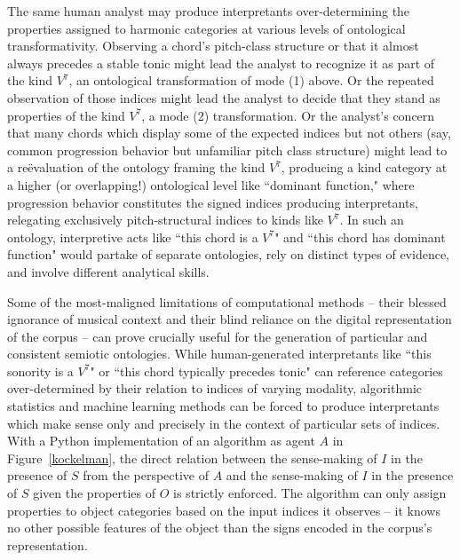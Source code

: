 The same human analyst may produce interpretants over-determining the properties assigned to harmonic categories at various levels of ontological transformativity.  Observing a chord's pitch-class structure or that it almost always precedes a stable tonic might lead the analyst to recognize it as part of the kind $V^7$, an ontological transformation of mode (1) above.  Or the repeated observation of those indices might lead the analyst to decide that they stand as properties of the kind $V^7$, a mode (2) transformation.  Or the analyst's concern that many chords which display some of the expected indices but not others (say, common progression behavior but unfamiliar pitch class structure) might lead to a re\"{e}valuation of the ontology framing the kind $V^7$, producing a kind category at a higher (or overlapping!) ontological level like ``dominant function," where progression behavior constitutes the signed indices producing interpretants, relegating exclusively pitch-structural indices to kinds like $V^7$.  In such an ontology, interpretive acts like ``this chord is a $V^7$" and ``this chord has dominant function" would partake of separate ontologies, rely on distinct types of evidence, and involve different analytical skills.

Some of the most-maligned limitations of computational methods -- their blessed ignorance of musical context and their blind reliance on the digital representation of the corpus -- can prove crucially useful for the generation of particular and consistent semiotic ontologies.  While human-generated interpretants like ``this sonority is a $V^7$" or ``this chord typically precedes tonic" can reference categories over-determined by their relation to indices of varying modality, algorithmic statistics and machine learning methods can be forced to produce interpretants which make sense only and precisely in the context of particular sets of indices.  With a Python implementation of an algorithm as agent $A$ in Figure~\ref{kockelman}, the direct relation between the sense-making of $I$ in the presence of $S$ from the perspective of $A$ and the sense-making of $I$ in the presence of $S$ given the properties of $O$ is strictly enforced.  The algorithm can only assign properties to object categories based on the input indices it observes -- it knows no other possible features of the object than the signs encoded in the corpus's representation.  

